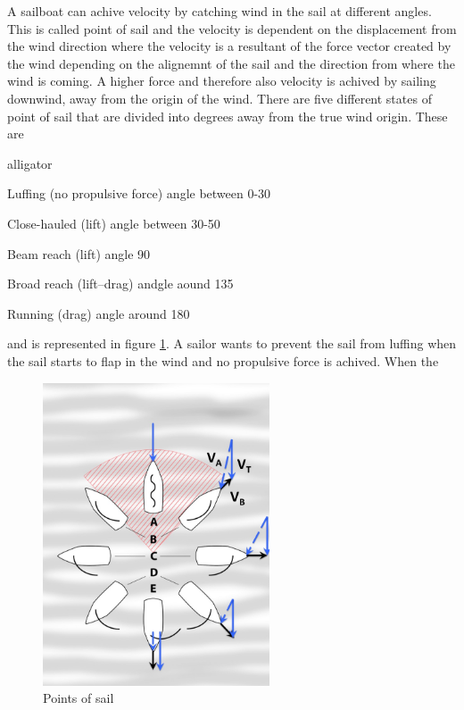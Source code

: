 A sailboat can achive velocity by catching wind in the sail at different angles. This is called point of sail and the velocity is dependent on the displacement from the wind direction where the velocity is a resultant of the force vector created by the wind depending on the alignemnt of the sail and the direction from where the wind is coming. A higher force and therefore also velocity is achived by sailing downwind, away from the origin of the wind. There are five different states of point of sail that are divided into degrees away from the true wind origin. These are
\begin{labeling}{alligator}
\item [Luffing] (no propulsive force) angle between 0-30\degree
\item [Close-hauled] (lift) angle between 30-50\degree
\item [Beam reach] (lift) angle 90\degree
\item [Broad reach] (lift–drag) andgle aound 135\degree
\item [Running] (drag) angle around 180\degree
\end{labeling}
and is represented in figure \ref{points-sail}. A sailor wants to prevent the sail from luffing when the sail starts to flap in the wind and no propulsive force is achived. When the 
\begin{figure}[H]
\centering
\includegraphics[width=0.6\textwidth]{Figures/Points_of_sail.jpg}
\caption{Points of sail}
\label{points-sail}
\end{figure}
